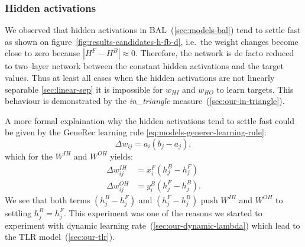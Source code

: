 
\subsubsection{Hidden activations}
\label{sec:our-hidden-activation} 

We observed that hidden activations in BAL~(\ref{sec:models-bal}) tend to settle fast as shown on figure~\ref{fig:results-candidates-h-fb-d}, i.e.~the weight changes become close to zero because $|H^F - H^B| \approx 0$. Therefore, the network is de facto reduced to two--layer network between the constant hidden activations and the target values. Thus at least all cases when the hidden activations are not linearly separable \ref{sec:linear-sep} it is impossible for $w_{HI}$ and $w_{HO}$ to learn targets. This behaviour is demonstrated by the \emph{in\_triangle} measure~(\ref{sec:our-in-triangle}). 

A more formal explaination why the hidden activations tend to settle fast could be given by the GeneRec learning rule \ref{eq:models-generec-learning-rule}: 
\begin{equation} 
  \Delta w_{ij} = a_i(b_j - a_j),
\end{equation} \nonumber 
which for the $W^{IH}$ and $W^{OH}$ yields: 
\begin{align} 
  \Delta w_{ij}^{IH} &= x^F_i(h^B_j - h^F_j) \nonumber \\ 
  \Delta w_{ij}^{OH} &= y^B_i(h^F_j - h^B_j). \nonumber  
\end{align} 
We see that both terms $(h^B_j - h^F_j)$ and $(h^F_j - h^B_j)$ push $W^{IH}$ and $W^{OH}$ to settling $h^B_j = h^F_j$. This experiment was one of the reasons we started to experiment with dynamic learning rate~(\ref{sec:our-dynamic-lambda}) which lead to the TLR model~(\ref{sec:our-tlr}). 

